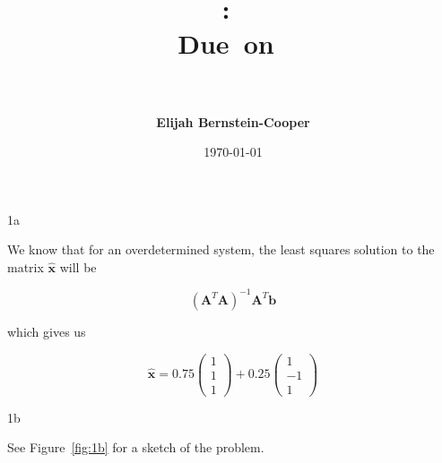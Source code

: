 \documentclass{article}
\title{\vspace{0in}
    \textmd{\textbf{\hmwkClass:\ \hmwkTitle}}\\
    \normalsize\vspace{0.1in}\small{Due\ on\ \hmwkDueDate}\\
    \vspace{0.1in}\large{\textit{\hmwkClassInstructor\ \hmwkClassTime}}
    \vspace{0.5in}}
\author{\textbf{Elijah Bernstein-Cooper}}
\date{\today} %
\begin{document}
\maketitle

\begin{homeworkProblem}

    \begin{homeworkSection}{1a}
        
        We know that for an overdetermined system, the least squares solution
        to the matrix $\bm{\hat{x}}$ will be 

        \begin{equation*}
            {(\bm{A}^T \bm{A})}^{-1}\bm{A}^T\bm{b}
        \end{equation*}

        \noindent which gives us

        \begin{equation*}
            \bm{\hat{x}} = 
                0.75 \left(\begin{matrix} 1 \\ 1 \\ 1 \end{matrix}\right) + 
                0.25 \left(\begin{matrix} 1 \\ -1 \\ 1 \end{matrix}\right)
        \end{equation*}

    \end{homeworkSection}

    \begin{homeworkSection}{1b}
        
        See Figure~\ref{fig:1b} for a sketch of the problem.

        \begin{figure}[!ht]
            \begin{centering}


\end{centering}
\end{figure}
\end{homeworkSection}
\end{homeworkProblem}
\end{document}
